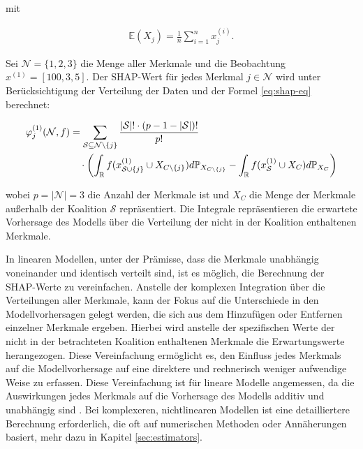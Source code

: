 mit 

\begin{align}
    \label{eq:e}
    \mathbb{E}(X_j) = \frac{1}{n} \sum_{i=1}^{n} x_j^{(i)}.
\end{align}     

Sei $\mathcal{N} = \{1, 2, 3\}$ die Menge aller Merkmale und die Beobachtung $x^{(1)} = [100, 3, 5]$. 
Der SHAP-Wert für jedes Merkmal $j \in \mathcal{N}$ wird unter Berücksichtigung der Verteilung der 
Daten und der Formel \ref{eq:shap-eq} berechnet:

\begin{align}
    \label{eq:shap-formular}
    \varphi^{(1)}_{j} (\mathcal{N}, f) &= \sum_{\mathcal{S} \subseteq \mathcal{N} \setminus \{j\}} \frac{|\mathcal{S}|! \cdot (p - 1 - |\mathcal{S}|)!}{p!} \\ \notag
    &\quad \cdot \left( \int_{\mathbb{R}} f(x^{(1)}_{\mathcal{S} \cup \{j\}} \cup X_{C \setminus \{j\}}) d\mathbb{P}_{X_{C \setminus \{j\}}} -
    \int_{\mathbb{R}} f(x^{(1)}_{\mathcal{S}} \cup X_{C}) d\mathbb{P}_{X_{C}} \right) 
\end{align}

wobei $p = |\mathcal{N}| = 3$ die Anzahl der Merkmale ist und $X_C$ die Menge der Merkmale 
außerhalb der Koalition $\mathcal{S}$ repräsentiert. Die Integrale repräsentieren die erwartete 
Vorhersage des Modells über die Verteilung der nicht in der Koalition enthaltenen Merkmale.

In linearen Modellen, unter der Prämisse, dass die Merkmale unabhängig voneinander und identisch verteilt sind, 
ist es möglich, die Berechnung der SHAP-Werte zu vereinfachen. Anstelle der komplexen Integration 
über die Verteilungen aller Merkmale, kann der Fokus auf die Unterschiede in den Modellvorhersagen gelegt werden, 
die sich aus dem Hinzufügen oder Entfernen einzelner Merkmale ergeben. 
Hierbei wird anstelle der spezifischen Werte der nicht in der betrachteten Koalition enthaltenen Merkmale 
die Erwartungswerte herangezogen. Diese Vereinfachung ermöglicht es, den Einfluss jedes Merkmals auf 
die Modellvorhersage auf eine direktere und rechnerisch weniger aufwendige Weise zu erfassen.
Diese Vereinfachung ist für lineare Modelle angemessen, da die Auswirkungen jedes Merkmals 
auf die Vorhersage des Modells additiv und unabhängig sind \cite[S. 48]{Molnar_2023}. Bei komplexeren, 
nichtlinearen Modellen ist eine detailliertere Berechnung erforderlich, 
die oft auf numerischen Methoden oder Annäherungen basiert, mehr dazu in Kapitel \ref{sec:estimators}.

